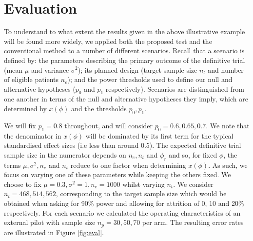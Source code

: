 \documentclass{article}
\begin{document}
\section{Evaluation}\label{sec:eval}

To understand to what extent the results given in the above illustrative example will be found more widely, we applied both the proposed test and the conventional method to a number of different scenarios. Recall that a scenario is defined by: the parameters describing the primary outcome of the definitive trial (mean $\mu$ and variance $\sigma^2$); its planned design (target sample size $n_t$ and number of eligible patients $n_e$); and the power thresholds used to define our null and alternative hypotheses ($p_0$ and $p_1$ respectively). Scenarios are distinguished from one another in terms of the null and alternative hypotheses they imply, which are determined by $x(\phi)$ and the thresholds $p_0, p_1$. 

We will fix $p_1 = 0.8$ throughout, and will consider $p_0 = 0.6, 0.65, 0.7$. We note that the denominator in $x(\phi)$ will be dominated by its first term for the typical standardised effect sizes (i.e less than around 0.5). The expected definitive trial sample size in the numerator depends on $n_e, n_t$ and $\phi_r$ and so, for fixed $\phi$, the terms $\mu, \sigma^2, n_e$ and $n_t$ reduce to one factor when determining $x(\phi)$. As such, we focus on varying one of these parameters while keeping the others fixed. We choose to fix $\mu = 0.3, \sigma^2 = 1, n_e = 1000$ whilst varying $n_t$. We consider $n_t =  468, 514, 562$, corresponding to the target sample size which would be obtained when asking for 90\% power and allowing for attrition of 0, 10 and 20\% respectively. For each scenario we calculated the operating characteristics of an external pilot with sample size $n_p = 30, 50, 70$ per arm. The resulting error rates are illustrated in Figure \ref{fig:eval}.
\end{document}
